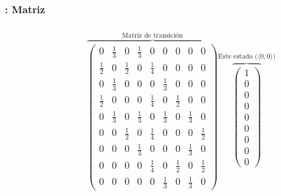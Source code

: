 \documentclass{beamer}
\begin{document}
\begin{frame}
  \frametitle{\SECTIONC}
  \framesubtitle{\EJC: Matriz}

  \begin{gather*}
    \overbrace{\begin{pmatrix}
        0 & \frac{1}{3} & 0 & \frac{1}{3} & 0 & 0 & 0 & 0 & 0  \\
        \frac{1}{2} & 0 & \frac{1}{2} & 0 & \frac{1}{4} & 0 & 0 & 0 & 0  \\
        0 & \frac{1}{3} & 0 & 0 & 0 & \frac{1}{3} & 0 & 0 & 0  \\
        \frac{1}{2} & 0 & 0 & 0 & \frac{1}{4} & 0 & \frac{1}{2} & 0 & 0  \\
        0 & \frac{1}{3} & 0 & \frac{1}{3} & 0 & \frac{1}{3} & 0 & \frac{1}{3} & 0  \\
        0 & 0 & \frac{1}{2} & 0 & \frac{1}{4} & 0 & 0 & 0 & \frac{1}{2} \\
        0 & 0 & 0 & \frac{1}{3} & 0 & 0 & 0 & \frac{1}{3} & 0  \\
        0 & 0 & 0 & 0 & \frac{1}{4} & 0 & \frac{1}{2} & 0 & \frac{1}{2} \\
        0 & 0 & 0 & 0 & 0 & \frac{1}{3} & 0 & \frac{1}{3} & 0
    \end{pmatrix}}^{\text{Matriz de transición}}
    \overbrace{\begin{pmatrix}
      1 \\ 0 \\ 0 \\ 0 \\ 0 \\ 0 \\ 0 \\ 0 \\ 0 
    \end{pmatrix}}^{\text{Este estado (\(\langle 0, 0 \rangle\))}}
  \end{gather*}
\end{frame}
\end{document}
